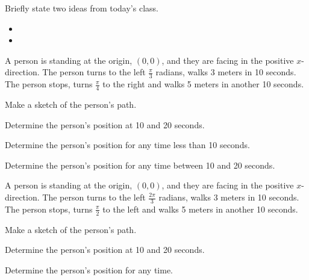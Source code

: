 \postClass

\begin{problem}
\item Briefly state two ideas from today's class.
  \begin{itemize}
  \item
  \item
  \end{itemize}
\item A person is standing at the origin, $(0,0)$, and they are facing
  in the positive $x$-direction. The person turns to the left
  $\frac{\pi}{3}$ radians, walks 3 meters in 10 seconds. The person
  stops, turns $\frac{\pi}{4}$ to the right and walks 5 meters in
  another 10 seconds.
  \begin{subproblem}
    \item  Make a sketch of the person's path.
      \vfill
    \item Determine the person's position at 10 and 20 seconds.
      \vfill
    \item Determine the person's position for any time less than 10
      seconds.
      \vfill
    \item Determine the person's position for any time between 10 and
      20 seconds.
      \vfill
  \end{subproblem}
  \clearpage
\item A person is standing at the origin, $(0,0)$, and they are facing
  in the positive $x$-direction. The person turns to the left
  $\frac{2\pi}{3}$ radians, walks 3 meters in 10 seconds. The person
  stops, turns $\frac{\pi}{2}$ to the left and walks 5 meters in
  another 10 seconds.
  \begin{subproblem}
    \item  Make a sketch of the person's path.
      \vfill
    \item Determine the person's position at 10 and 20 seconds.
      \vfill
    \item Determine the person's position for any time.
      \vfill
  \end{subproblem}
\end{problem}


